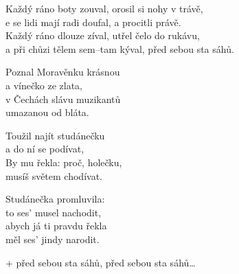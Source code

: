 
\cho{}
Každý ráno boty zouval, orosil si nohy v trávě,\\
e se lidi mají radi doufal, a procitli právě.\\
Každý ráno dlouze zíval, utřel čelo do rukávu,\\
a při chůzi tělem sem--tam kýval, před sebou sta sáhů.

\ve{}
Poznal Moravěnku krásnou\\
a \emph{} vínečko ze zlata,\\
v Čechách slávu muzikantů\\
umazanou od bláta.

\cho{} 

\ve{}
Toužil najít studánečku\\
a do ní se podívat,\\
By mu řekla: proč, holečku,\\
musíš světem chodívat.

\ve{}
Studánečka promluvila:\\
to ses' musel nachodit,\\
abych já ti pravdu řekla\\
měl ses' jindy narodit.

\cho{}
+ před sebou sta sáhů, před sebou sta sáhů\ldots{}

\esong{}

